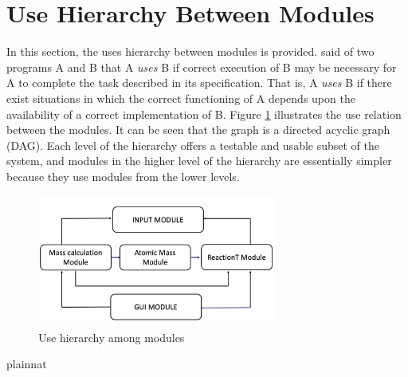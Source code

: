 \documentclass[12pt, titlepage]{article}
\begin{document}

\section{Use Hierarchy Between Modules} \label{SecUse}

In this section, the uses hierarchy between modules is
provided. \cite{Parnas:1978} said of two programs A and B that A {\em uses} B if
correct execution of B may be necessary for A to complete the task described in
its specification. That is, A {\em uses} B if there exist situations in which
the correct functioning of A depends upon the availability of a correct
implementation of B.  Figure \ref{FigUH} illustrates the use relation between
the modules. It can be seen that the graph is a directed acyclic graph
(DAG). Each level of the hierarchy offers a testable and usable subset of the
system, and modules in the higher level of the hierarchy are essentially simpler
because they use modules from the lower levels.

\begin{figure}[H]
\centering
\includegraphics[width=0.7\textwidth]{UseHierarchy.png}
\caption{Use hierarchy among modules}
\label{FigUH}
\end{figure}

\newpage 
 {plainnat}


\end{document}
